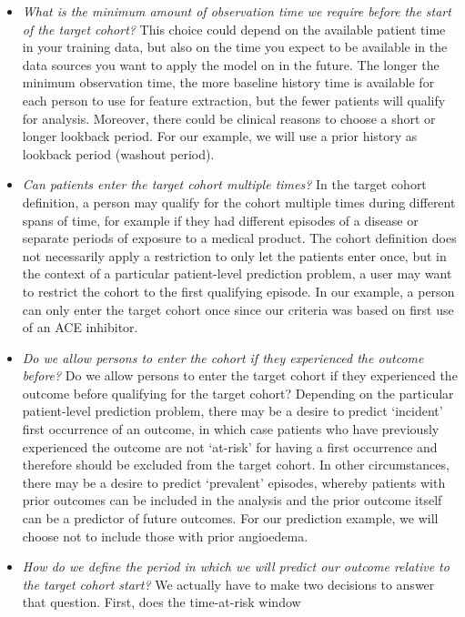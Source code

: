 \documentclass[]{book}
\begin{document}
\begin{itemize}
\item
  \emph{What is the minimum amount of observation time we require before
  the start of the target cohort?} This choice could depend on the
  available patient time in your training data, but also on the time you
  expect to be available in the data sources you want to apply the model
  on in the future. The longer the minimum observation time, the more
  baseline history time is available for each person to use for feature
  extraction, but the fewer patients will qualify for analysis.
  Moreover, there could be clinical reasons to choose a short or longer
  lookback period. For our example, we will use a prior history as
  lookback period (washout period).
\item
  \emph{Can patients enter the target cohort multiple times?} In the
  target cohort definition, a person may qualify for the cohort multiple
  times during different spans of time, for example if they had
  different episodes of a disease or separate periods of exposure to a
  medical product. The cohort definition does not necessarily apply a
  restriction to only let the patients enter once, but in the context of
  a particular patient-level prediction problem, a user may want to
  restrict the cohort to the first qualifying episode. In our example, a
  person can only enter the target cohort once since our criteria was
  based on first use of an ACE inhibitor.
\item
  \emph{Do we allow persons to enter the cohort if they experienced the
  outcome before?} Do we allow persons to enter the target cohort if
  they experienced the outcome before qualifying for the target cohort?
  Depending on the particular patient-level prediction problem, there
  may be a desire to predict `incident' first occurrence of an outcome,
  in which case patients who have previously experienced the outcome are
  not `at-risk' for having a first occurrence and therefore should be
  excluded from the target cohort. In other circumstances, there may be
  a desire to predict `prevalent' episodes, whereby patients with prior
  outcomes can be included in the analysis and the prior outcome itself
  can be a predictor of future outcomes. For our prediction example, we
  will choose not to include those with prior angioedema.
\item
  \emph{How do we define the period in which we will predict our outcome
  relative to the target cohort start?} We actually have to make two
  decisions to answer that question. First, does the time-at-risk window

\end{itemize}
\end{document}
